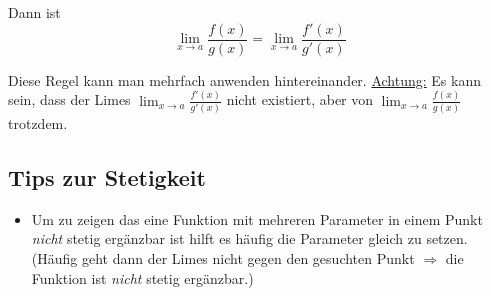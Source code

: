 Dann ist
\[
\lim_{x \to a} \frac{f(x)}{g(x)} = \lim_{x \to a}
\frac{f'(x)}{g'(x)}
\]

Diese Regel kann man mehrfach anwenden hintereinander. \underline{Achtung:} Es
kann sein, dass der Limes $\lim_{x \to a} \frac{f'(x)}{g'(x)}$ nicht existiert,
aber von $\lim_{x \to a} \frac{f(x)}{g(x)}$ trotzdem.


\subsection{Tips zur Stetigkeit}
\begin{itemize}
  \item Um zu zeigen das eine Funktion mit mehreren Parameter in einem Punkt \emph{nicht} stetig ergänzbar ist
	hilft es häufig die Parameter gleich zu setzen. (Häufig geht dann der Limes nicht gegen den gesuchten Punkt
	 $\Rightarrow$ die Funktion ist \emph{nicht} stetig ergänzbar.)
\end{itemize}
